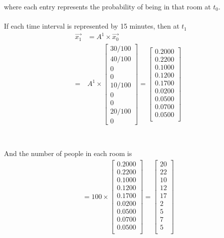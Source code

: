\documentclass[letterpaper,12pt,titlepage,oneside,final]{book}
\begin{document}
where each entry represents the probability of being in that room at $t_{0}$.
\\
\\ 
If each time interval is represented by 15 minutes, then at $t_1$
\begin{align*}
\vec{x_{1}} &= A^1\times \vec{x_0}\\ =& A^1 \times 
\begin{bmatrix}
30/100 \\ 40/100 \\ 0 \\ 0 \\ 10/100 \\ 0 \\ 0 \\ 20/100 \\ 0  \end{bmatrix}
= \begin{bmatrix}
    0.2000\\
    0.2200\\
    0.1000\\
    0.1200\\
    0.1700\\
    0.0200\\
    0.0500\\
    0.0700\\
    0.0500\\
    \end{bmatrix}\\
\end{align*}
\\
\\
And the number of people in each room is
\begin{align*}
= 100\times \begin{bmatrix}
    0.2000\\
    0.2200\\
    0.1000\\
    0.1200\\
    0.1700\\
    0.0200\\
    0.0500\\
    0.0700\\
    0.0500\\
    \end{bmatrix} = 
    \begin{bmatrix}
   20\\
   22\\
   10\\
   12\\
   17\\
    2\\
    5\\
    7\\
    5\\
    \end{bmatrix}
\end{align*}
\end{document}
